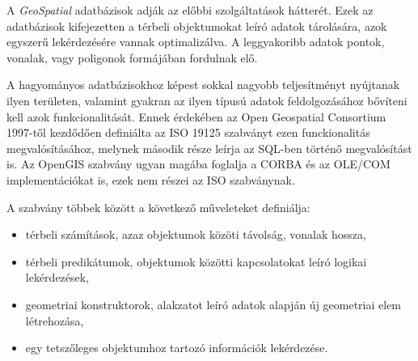
A \textit{GeoSpatial} adatbázisok adják az előbbi szolgáltatások hátterét. Ezek az adatbázisok kifejezetten a térbeli objektumokat leíró adatok tárolására, azok egyszerű lekérdezésére
vannak optimalizálva. A leggyakoribb adatok pontok, vonalak, vagy poligonok formájában fordulnak elő. 

A hagyományos adatbázisokhoz képest sokkal nagyobb teljesítményt nyújtanak
ilyen területen, valamint gyakran az ilyen típusú adatok feldolgozásához bővíteni kell azok funkcionalitását. Ennek érdekében az Open Geospatial Consortium 1997-től kezdődően
definiálta az ISO 19125 szabványt ezen funckionalitás megvalósításához, melynek második része leírja az SQL-ben történő megvalósítást is. Az OpenGIS szabvány ugyan magába
foglalja a CORBA és az OLE/COM implementációkat is, ezek nem részei az ISO szabványnak.

A szabvány többek között a következő műveleteket definiálja:
\begin{itemize}
\item térbeli számítások, azaz objektumok közöti távolság, vonalak hossza,
\item térbeli predikátumok, objektumok közötti kapcsolatokat leíró logikai lekérdezések,
\item geometriai konstruktorok, alakzatot leíró adatok alapján új geometriai elem létrehozása,
\item egy tetszőleges objektumhoz tartozó információk lekérdezése.
\end{itemize}

